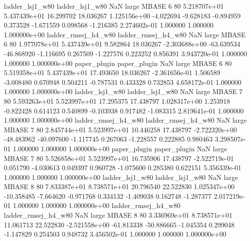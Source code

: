     ladder_lsj1_w80     ladder_lsj1_w80                   NaN      large    MBASE                 6 80 5.218707e+01   5.437439e+01     16.299702      18.036267  1.125156e+00     -4.022694     -9.628183    -0.894959       0.373528 -1.671559   0.098568    -1.216385   2.274602e-01            1.000000        1.000000        1.000000e+00
ladder_rmsej_h4_w80 ladder_rmsej_h4_w80                   NaN      large    MBASE                 6 80 1.977078e+01   5.437439e+01      9.582864      18.036267 -2.303688e+00    -63.639534    -46.868920    -1.116695       0.267509 -1.227576   0.223252     0.856391   3.943720e-01            1.000000        1.000000        1.000000e+00
       paper_plugin        paper_plugin                   NaN      large    MBASE                 6 80 5.519358e+01   5.437439e+01     17.493650      18.036267 -2.361656e-01      1.506589     -3.008480     0.670948       0.504211 -0.787531   0.433328     0.732853   4.658172e-01            1.000000        1.000000        1.000000e+00
    ladder_lsj1_w80     ladder_lsj1_w80                   NaN      large    MBASE                 7 80 5.593263e+01   5.523997e+01     17.295375      17.438797  1.028317e+00      1.253918     -0.822428     0.614123       0.540899 -0.103938   0.917482    -1.083315   2.819641e-01            1.000000        1.000000        1.000000e+00
ladder_rmsej_h4_w80 ladder_rmsej_h4_w80                   NaN      large    MBASE                 7 80 2.845744e+01   5.523997e+01     10.446258      17.438797 -2.722320e+00    -48.483962    -40.097600    -1.117745       0.267063 -1.228557   0.222885     0.980463   3.298507e-01            1.000000        1.000000        1.000000e+00
       paper_plugin        paper_plugin                   NaN      large    MBASE                 7 80 5.526858e+01   5.523997e+01     16.735906      17.438797 -2.522719e-01      0.051790     -4.030613     0.049397       0.960728 -1.075600   0.285380     0.622151   5.356339e-01            1.000000        1.000000        1.000000e+00
    ladder_lsj1_w80     ladder_lsj1_w80                   NaN      large    MBASE                 8 80 7.833387e+01   8.738571e+01     20.796540      22.522830  1.025347e+00    -10.358485     -7.664620    -0.971768       0.334132 -1.409038   0.162748    -1.287377   2.017219e-01            1.000000        1.000000        1.000000e+00
ladder_rmsej_h4_w80 ladder_rmsej_h4_w80                   NaN      large    MBASE                 8 80 3.336969e+01   8.738571e+01     11.061713      22.522830 -2.521558e+00    -61.813338    -50.886665    -1.045354       0.299048 -1.147829   0.254503     0.948732   3.456502e-01            1.000000        1.000000        1.000000e+00
